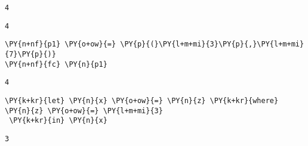    
    \begin{Verbatim}[commandchars=\\\{\}]
4
    \end{Verbatim}

    
    
    \begin{Verbatim}[commandchars=\\\{\}]
4
    \end{Verbatim}

    
    \begin{tcolorbox}[breakable, size=fbox, boxrule=1pt, pad at break*=1mm,colback=cellbackground, colframe=cellborder, top=.75ex]
\begin{Verbatim}[commandchars=\\\{\}]
\PY{n+nf}{p1} \PY{o+ow}{=} \PY{p}{(}\PY{l+m+mi}{3}\PY{p}{,}\PY{l+m+mi}{7}\PY{p}{)}
\PY{n+nf}{fc} \PY{n}{p1}
\end{Verbatim}
\end{tcolorbox}

    
    \begin{Verbatim}[commandchars=\\\{\}]
4
    \end{Verbatim}

    
    \begin{tcolorbox}[breakable, size=fbox, boxrule=1pt, pad at break*=1mm,colback=cellbackground, colframe=cellborder, top=.75ex]
\begin{Verbatim}[commandchars=\\\{\}]
\PY{k+kr}{let} \PY{n}{x} \PY{o+ow}{=} \PY{n}{z} \PY{k+kr}{where} \PY{n}{z} \PY{o+ow}{=} \PY{l+m+mi}{3}
 \PY{k+kr}{in} \PY{n}{x}
\end{Verbatim}
\end{tcolorbox}

    
    \begin{Verbatim}[commandchars=\\\{\}]
3
    \end{Verbatim}

    
    \begin{tcolorbox}[breakable, size=fbox, boxrule=1pt, pad at break*=1mm,colback=cellbackground, colframe=cellborder, top=.75ex]
\begin{Verbatim}[commandchars=\\\{\}]

\end{Verbatim}
\end{tcolorbox}


    
    
    
